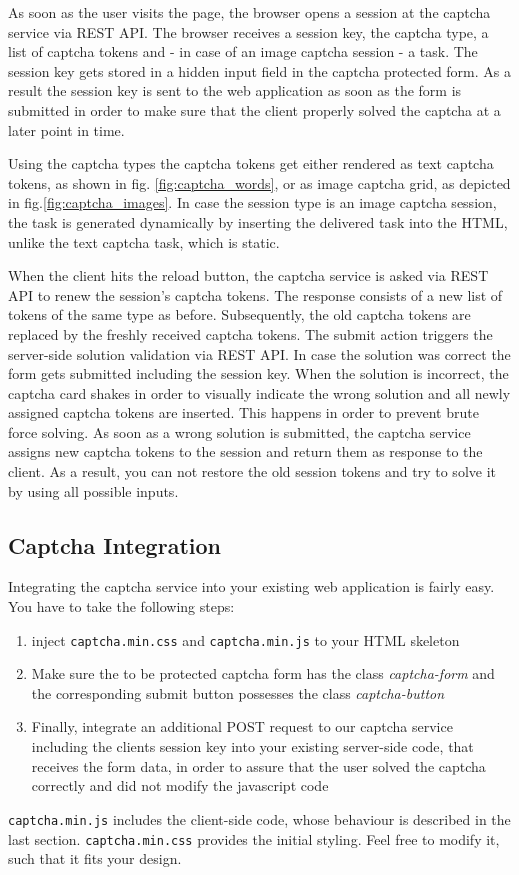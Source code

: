  As soon as the user visits the page, the browser opens a session at the captcha service via REST API. The browser receives a session key, the captcha type, a list of captcha tokens and - in case of an image captcha session - a task. The session key gets stored in a hidden input field in the captcha protected form. As a result the session key is sent to the web application as soon as the form is submitted in order to make sure that the client properly solved the captcha at a later point in time. 
 
 Using the captcha types the captcha tokens get either rendered as text captcha tokens, as shown in fig. \ref{fig:captcha_words}, or as image captcha grid, as depicted in fig.\ref{fig:captcha_images}. In case the session type is an image captcha session, the task is generated dynamically by inserting the delivered task into the HTML, unlike the text captcha task, which is static.
 
 When the client hits the reload button, the captcha service is asked via REST API to renew the session's captcha tokens. The response consists of a new list of tokens of the same type as before. Subsequently, the old captcha tokens are replaced by the freshly received captcha tokens. The submit action triggers the server-side solution validation via REST API. In case the solution was correct the form gets submitted including the session key. When the solution is incorrect, the captcha card shakes in order to visually indicate the wrong solution and all newly assigned captcha tokens are inserted. This happens in order to prevent brute force solving. As soon as a wrong solution is submitted, the captcha service assigns new captcha tokens to the session and return them as response to the client. As a result, you can not restore the old session tokens and try to solve it by using all possible inputs.

\subsection{Captcha Integration}
\label{subsec:Captcha Integration}

Integrating the captcha service into your existing web application is fairly easy. You have to take the following steps:
\begin{enumerate}
	\item inject \texttt{captcha.min.css} and \texttt{captcha.min.js} to your HTML skeleton
	\item  Make sure the to be protected captcha form has the class \textit{captcha-form} and the corresponding submit button possesses the class \textit{captcha-button}
	\item Finally, integrate an additional POST request to our captcha service including the clients session key into your existing server-side code, that receives the form data, in order to assure that the user solved the captcha correctly and did not modify the javascript code
\end{enumerate}

\texttt{captcha.min.js} includes the client-side code, whose behaviour is described in the last section. \texttt{captcha.min.css} provides the initial styling. Feel free to modify it, such that it fits your design. 

\clearpage
